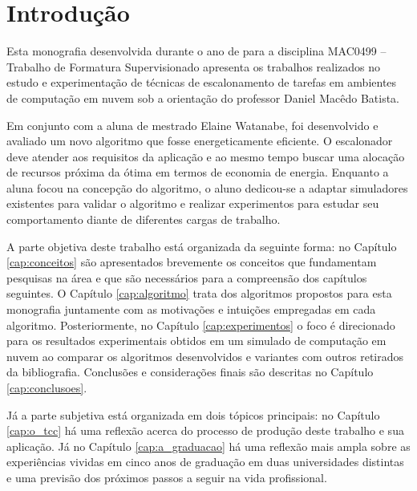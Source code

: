 \chapter{Introdução}
\label{cap:introducao}
Esta monografia desenvolvida durante o ano de  para a disciplina MAC0499 --
Trabalho de Formatura Supervisionado apresenta os trabalhos realizados no estudo
e experimentação de técnicas de escalonamento de tarefas em ambientes de 
computação em nuvem sob a orientação do professor Daniel Macêdo Batista.

Em conjunto com a aluna de mestrado Elaine Watanabe, foi desenvolvido e avaliado
um novo algoritmo que fosse energeticamente eficiente. O escalonador deve
atender aos requisitos da aplicação e ao mesmo tempo buscar uma alocação
de recursos próxima da ótima em termos de economia de energia.
Enquanto a aluna focou na concepção do algoritmo, o aluno dedicou-se a adaptar
simuladores existentes para validar o algoritmo e realizar experimentos para 
estudar seu comportamento diante de diferentes cargas de trabalho.

A parte objetiva deste trabalho está organizada da seguinte forma: no Capítulo
\ref{cap:conceitos} são apresentados brevemente os conceitos que fundamentam
pesquisas na área e que são necessários para a compreensão dos capítulos
seguintes. O Capítulo \ref{cap:algoritmo} trata dos algoritmos propostos para
esta monografia juntamente com as motivações e intuições empregadas em cada
algoritmo. Posteriormente, no Capítulo \ref{cap:experimentos} o foco é
direcionado para os resultados experimentais obtidos em um simulado de
computação em nuvem ao comparar os algoritmos desenvolvidos e variantes com
outros retirados da bibliografia. Conclusões e considerações finais são descritas
no Capítulo \ref{cap:conclusoes}.

Já a parte subjetiva está organizada em dois tópicos principais: no Capítulo 
\ref{cap:o_tcc} há uma reflexão acerca do processo de produção deste trabalho
e sua aplicação. Já no Capítulo \ref{cap:a_graduacao} há uma reflexão mais ampla
sobre as experiências vividas em cinco anos de graduação em duas universidades
distintas e uma previsão dos próximos passos a seguir na vida profissional.


